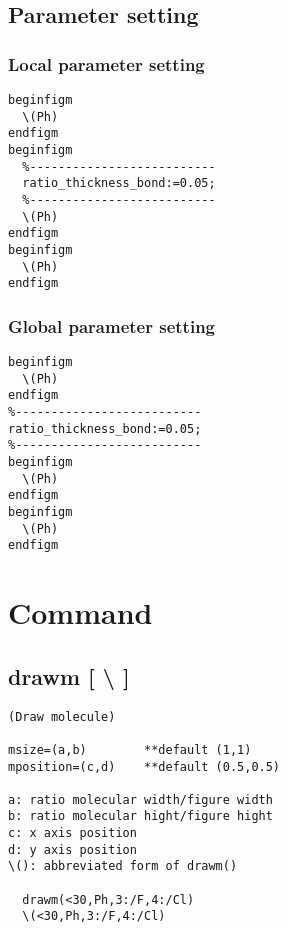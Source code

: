 \documentclass[a4paper]{article}
\begin{document}
\subsection{Parameter setting}
\subsubsection{Local parameter setting}
%
%
\begin{verbatim}
beginfigm
  \(Ph)
endfigm
beginfigm
  %--------------------------
  ratio_thickness_bond:=0.05;
  %--------------------------
  \(Ph)
endfigm
beginfigm
  \(Ph)
endfigm
\end{verbatim}
\quad
{}
\subsubsection{Global parameter setting}
\begin{verbatim}
beginfigm
  \(Ph)
endfigm
%--------------------------
ratio_thickness_bond:=0.05;
%--------------------------
beginfigm
  \(Ph)
endfigm
beginfigm
  \(Ph)
endfigm
\end{verbatim}
\quad
{}
\section{Command}
\subsection{drawm [ \textbackslash{ }]}
%
\index{\textbackslash}%
\begin{verbatim}
(Draw molecule)

msize=(a,b)        **default (1,1)
mposition=(c,d)    **default (0.5,0.5)

a: ratio molecular width/figure width
b: ratio molecular hight/figure hight
c: x axis position
d: y axis position
\(): abbreviated form of drawm()

  drawm(<30,Ph,3:/F,4:/Cl)
  \(<30,Ph,3:/F,4:/Cl)
\end{verbatim}
\end{document}
